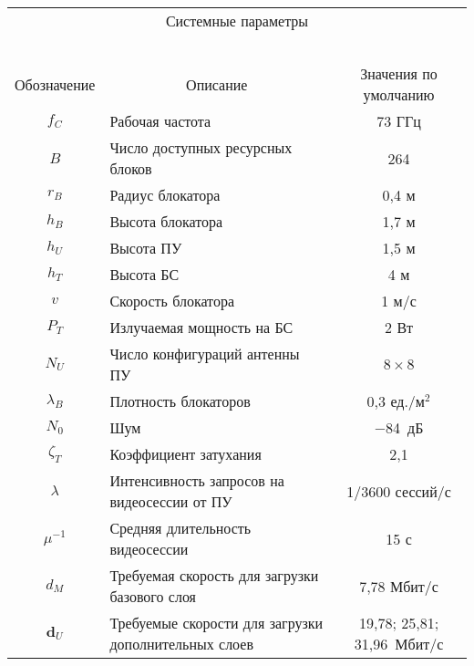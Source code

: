 \begin{multicols}{2}
  \begin{table*}[b]\small
  \begin{center}
  \begin{tabular}{|c|l|c|}
  \multicolumn{3}{c}{Системные параметры}\\
  \multicolumn{3}{c}{\ }\\[-6pt]
  \hline
Обозначение&\multicolumn{1}{c|}{Описание}&Значения по умолчанию\\
\hline
$f_C$ &Рабочая частота&73 ГГц\\
$B$&Число доступных ресурсных блоков&264\\
$r_B$&Радиус блокатора&0,4 м\\
$h_B$&Высота блокатора&1,7 м\\
$h_U$&Высота ПУ&1,5 м\\
$h_T$&Высота БС&4 м\\
$v$&Скорость блокатора&1 м/с\\
$P_T$&Излучаемая мощность на БС&2 Вт\\
$N_U$&Число конфигураций антенны ПУ&$8\times8$\\
$\lambda_B$&Плотность блокаторов&0,3 ед./м$^2$\\
$N_0$&Шум&$-$84~дБ\\
$\zeta_T$&Коэффициент затухания&2,1\\
$\lambda$&Интенсивность запросов на видеосессии от ПУ&1/3600 сессий/с\\
$\mu^{-1}$&Средняя длительность видеосессии&15 с\\
$d_M$&Требуемая скорость для загрузки базового слоя&7,78 Мбит/с\\
$\mathbf{d}_U$&Требуемые скорости для загрузки дополнительных слоев&19{,}78; 
25{,}81; 31{,}96~Мбит/с\\
\hline
\end{tabular}
\end{center}
\setcounter{table}{0}
\renewcommand{\tablename}{\protect\bf Рис.}
\vspace*{7pt}
  \begin{center}  
    \mbox{%
\epsfxsize=163mm
}
\end{center}
\vspace*{-9pt}
  \end{table*}
  

\end{multicols}
